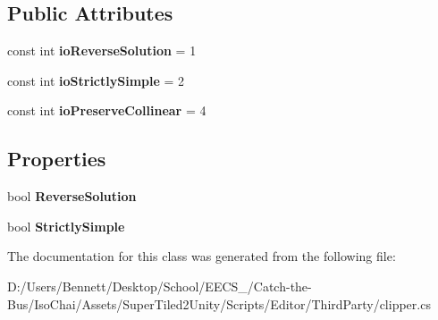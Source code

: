 \subsection*{Public Attributes}
\begin{DoxyCompactItemize}
\item 
\mbox{\label{class_super_tiled2_unity_1_1_editor_1_1_clipper_lib_1_1_clipper_a7ff414f7d853f9fea1aae160f1e17e1b}} 
const int {\bfseries io\+Reverse\+Solution} = 1
\item 
\mbox{\label{class_super_tiled2_unity_1_1_editor_1_1_clipper_lib_1_1_clipper_a60ed0202dab62bd82f17a79b0baa1db9}} 
const int {\bfseries io\+Strictly\+Simple} = 2
\item 
\mbox{\label{class_super_tiled2_unity_1_1_editor_1_1_clipper_lib_1_1_clipper_ade2c0b800fc70dfad27113d9d5f75518}} 
const int {\bfseries io\+Preserve\+Collinear} = 4
\end{DoxyCompactItemize}
\subsection*{Properties}
\begin{DoxyCompactItemize}
\item 
\mbox{\label{class_super_tiled2_unity_1_1_editor_1_1_clipper_lib_1_1_clipper_a95c438e81006c3df66cb2a1bec09bb0e}} 
bool {\bfseries Reverse\+Solution}
\item 
\mbox{\label{class_super_tiled2_unity_1_1_editor_1_1_clipper_lib_1_1_clipper_a6dfc0446264eb53184439211c4725548}} 
bool {\bfseries Strictly\+Simple}
\end{DoxyCompactItemize}


The documentation for this class was generated from the following file\+:\begin{DoxyCompactItemize}
\item 
D\+:/\+Users/\+Bennett/\+Desktop/\+School/\+E\+E\+C\+S\+\_/\+Catch-\/the-\/\+Bus/\+Iso\+Chai/\+Assets/\+Super\+Tiled2\+Unity/\+Scripts/\+Editor/\+Third\+Party/clipper.\+cs\end{DoxyCompactItemize}
